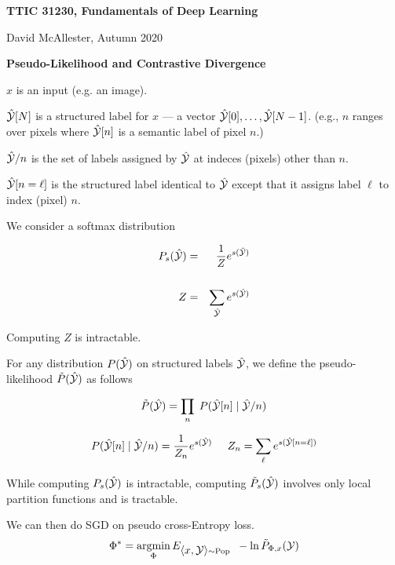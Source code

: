 




{\Huge

  \centerline{\bf TTIC 31230, Fundamentals of Deep Learning}
  \bigskip
  \centerline{David McAllester, Autumn 2020}
  \vfill
  \vfill
  \centerline{\bf Pseudo-Likelihood and Contrastive Divergence}
\vfill
\vfill
\vfill


$x$ is an input (e.g. an image).

\vfill
$\hat{\cal Y} [N]$ is a structured label for $x$ --- a vector $\hat{\cal Y}[0],\ldots,\hat{\cal Y}[N-1]$. (e.g., $n$ ranges over pixels where $\hat{\cal Y}[n]$ is a semantic label of pixel $n$.)

\vfill
$\hat{\cal Y}/n$ is the set of labels assigned by $\hat{\cal Y}$ at indeces (pixels) other than $n$.

\vfill
$\hat{\cal Y}[n=\ell]$ is the structured label identical to $\hat{\cal Y}$ except that it assigns label $\ell$ to index (pixel) $n$.


\vfill
We consider a softmax distribution

\vfill
\begin{eqnarray*}
P_s(\hat{\cal Y}) & = & \frac{1}{Z}e^{s(\hat{\cal Y})} \\
\\
Z & = & \sum_{\hat{\cal Y}} e^{s(\hat{\cal Y})}
\end{eqnarray*}

\vfill
Computing $Z$ is intractable.


For any distribution $P(\hat{\cal Y})$ on structured labels $\hat{\cal Y}$,
we define the {\color{red} pseudo-likelihood}  $\tilde{P}(\hat{\cal Y})$ as follows

{\color{red} $$\tilde{P}(\hat{\cal Y}) = \prod_n\;P(\hat{\cal Y}[n]\;|\; \hat{\cal Y}/n)$$}

\vfill
$$P(\hat{\cal Y}[n]\;|\;\hat{\cal Y}/n) = \frac{1}{Z_n}e^{s(\hat{\cal Y})}\;\;\;\;\;Z_n = \sum_{\ell} e^{s(\hat{\cal Y}[n=\ell])}$$

\vfill
While computing $P_s(\hat{\cal Y})$ is intractable, computing $\tilde{P}_s(\hat{\cal Y})$ involves only local partition functions and is tractable.


We can then do SGD on pseudo cross-Entropy loss.
\vfill
{\color{red} $$\Phi^* = \operatorname*{argmin}_\Phi E_{{\mbox{$\langle x,{\cal Y}\rangle$}} \sim \mathrm{Pop}}\;\;-\ln \tilde{P}_{\Phi,x}({\cal Y})$$}

}
